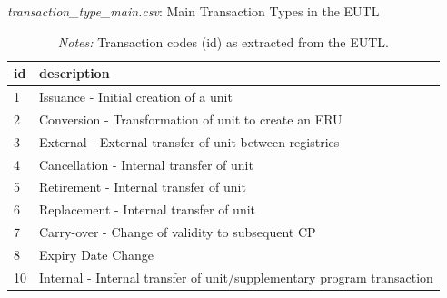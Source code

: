 \documentclass[authoryear]{elsarticle}
\begin{document}
\begin{table}[htbp]\scriptsize
	\caption{\textit{transaction\_type\_main.csv}: Main Transaction Types in the EUTL}\label{tab:transTypesMain}
	\centering
	\begin{tabular*}{\textwidth}{@{}@{\extracolsep{\fill}} ll @{}}
		\toprule
		\toprule
		\textbf{id} & \textbf{description} \\
		\midrule
		1     & Issuance - Initial creation of a unit \\
		2     & Conversion - Transformation of unit to create an ERU \\
		3     & External - External transfer of unit between registries \\
		4     & Cancellation - Internal transfer of unit \\
		5     & Retirement - Internal transfer of unit \\
		6     & Replacement - Internal transfer of unit \\
		7     & Carry-over - Change of validity to subsequent CP \\
		8     & Expiry Date Change \\
		10    & Internal - Internal transfer of unit/supplementary program transaction \\
		\bottomrule
		\bottomrule
	\end{tabular*}%
	\vspace{-3ex}
	\caption*{\footnotesize \emph{Notes:} Transaction codes (id) as extracted from the EUTL.}
	\vspace{0ex}
\end{table}%
\end{document}
